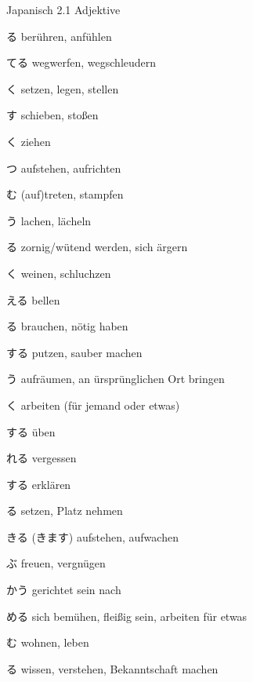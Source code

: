 \begin{multicols*}{2}
\begin{flushleft}
\begin{labeling}{Japanisch 2.1 Adjektive}
	\item [\ruby{触}{さわ}る] berühren, anfühlen
	
	\item [\ruby{捨}{す}てる] wegwerfen, wegschleudern
	\item [\ruby{置}{お}く] setzen, legen, stellen
	\item [\ruby{押}{お}す] schieben, stoßen
	\item [\ruby{引}{ひ}く] ziehen
	\item [\ruby{立}{た}つ] aufstehen, aufrichten
	\item [\ruby{踏}{ふ}む] (auf)treten, stampfen
	\item [\ruby{笑}{わら}う] lachen, lächeln
	\item [\ruby{怒}{おこ}る] zornig/wütend werden, sich ärgern
	\item [\ruby{泣}{な}く] weinen, schluchzen
	
	\item [\ruby{吠}{ほ}える] bellen
	\item [\ruby{要}{い}る] brauchen, nötig haben
	
	\item [\ruby{掃除}{そうじ}する] putzen, sauber machen
	\item [\ruby{仕舞う}{しま}う] aufräumen, an ürsprünglichen Ort bringen
	\item [\ruby{働く}{はたら}く] arbeiten (für jemand oder etwas)
	\item [\ruby{練習}{れんしゅう}する] üben
	\item [\ruby{忘}{わす}れる] vergessen
	\item [\ruby{説明}{せつめい}する] erklären
	\item [\ruby{座る}{すわ}る] setzen, Platz nehmen
	\item [\ruby{起}{お}きる (\ruby{起}{お}きます)] aufstehen, aufwachen
	
	\item [\ruby{喜}{よろこ}ぶ] freuen, vergnügen
	
	\item [\ruby{向}{む}かう] gerichtet sein nach
	\item [\ruby{努}{つと}める] sich bemühen, fleißig sein, arbeiten für etwas
	\item [\ruby{住}{す}む] wohnen, leben
	\item [\ruby{知}{し}る] wissen, verstehen, Bekanntschaft machen
	

\end{labeling}
\end{flushleft}
\end{multicols*}
